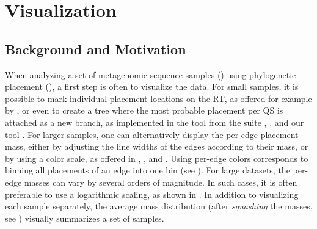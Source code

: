
\chapter{Visualization}
\label{ch:Visualization}



\section{Background and Motivation}
\label{ch:Visualization:sec:Motivation}

When analyzing a set of metagenomic sequence samples ()
using phylogenetic placement (),
a first step is often to visualize the data.
For small samples, it is possible to mark individual placement locations on the \acf{RT},
as offered for example by  \cite{Letunic2016},
or even to create a tree where the most probable placement per \acf{QS} is attached as a new branch,
as implemented in the  tool from the  suite \cite{Matsen2010},
 \cite{Berger2011,Stamatakis2014}, and our tool  \cite{Czech2019-genesis-gappa}.
For larger samples, one can alternatively display the per-edge placement mass,
either by adjusting the line widths of the edges according to their mass, or by using a color scale,
as offered in  \cite{Yu2017}, , and .
Using per-edge colors corresponds to binning all placements of an edge into one bin
(see ).
For large datasets, the per-edge masses can vary by several orders of magnitude.
In such cases, it is often preferable to use a logarithmic scaling, as shown in .
In addition to visualizing each sample separately, the average mass distribution
(after \emph{squashing} the masses,
see )
visually summarizes a set of samples.

